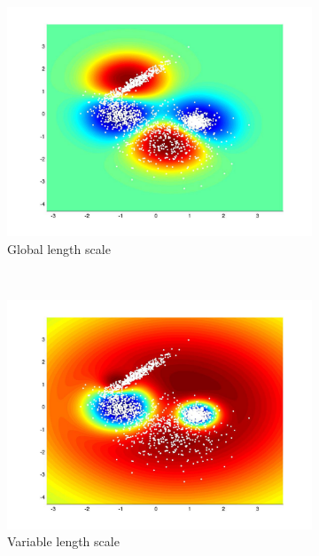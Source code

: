 \documentclass[useAMS,usenatbib,fleqn]{mn2e}
\begin{document}
\begin{figure}
         \begin{subfigure}[b]{90 px}
                \includegraphics[trim = 150px 100px 150px 70px, clip=true,width=\textwidth]{global4.jpg}
                \caption{Global length scale}
        \end{subfigure}
        ~
         \begin{subfigure}[b]{90 px}
                \includegraphics[trim = 150px 100px 150px 70px, clip=true,width=\textwidth]{VL4.jpg}
                \caption{Variable length scale}
        \end{subfigure}
        ~
        \begin{subfigure}[b]{90 px}

\end{subfigure}
\end{figure}
\end{document}
